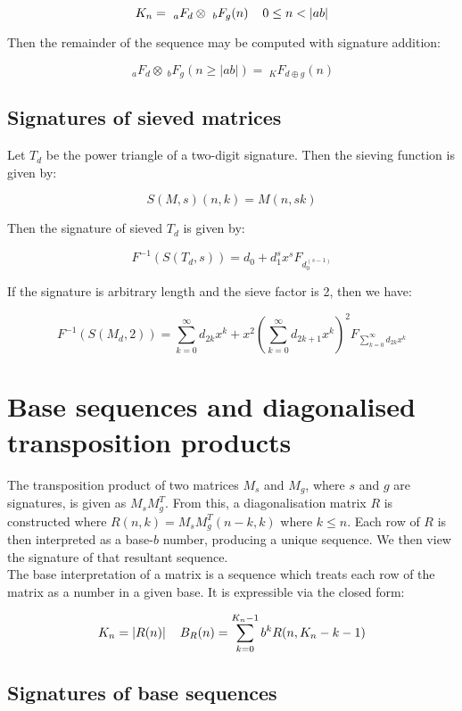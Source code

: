 \documentclass{article}
\begin{document}
$$K_n = ~_a F_d \otimes ~_b F_g (n) \hspace{4mm} 0 \leq n < |ab|$$

\noindent Then the remainder of the sequence may be computed with signature addition:

$$~_a F_d \otimes ~_b F_g (n \geq |ab|) = ~_K F_{d \oplus g}(n)$$

\subsection{Signatures of sieved matrices}

Let $T_d$ be the power triangle of a two-digit signature. Then the sieving function is given by:

$$S(M, s)(n, k) = M(n, sk)$$

\noindent Then the signature of sieved $T_d$ is given by:

$$F^{-1}(S(T_d, s)) = d_0 + d_1^s x^s F_{d_0^{(s-1)}}$$

\noindent If the signature is arbitrary length and the sieve factor is 2, then we have:

$$F^{-1}(S(M_d, 2)) = \sum_{k=0}^{\infty} d_{2k} x^k + x^2 \left( \sum_{k=0}^{\infty} d_{2k+1} x^k \right)^2 F_{\displaystyle \sum_{k=0}^{\infty} d_{2k} x^k}$$

\section{Base sequences and diagonalised transposition products}

The transposition product of two matrices $M_s$ and $M_g$, where $s$ and $g$ are signatures, is given as $M_s M_g^T$. From this, a diagonalisation matrix $R$ is constructed where $R(n,k) = M_s M_g^T (n-k, k)$ where $k \leq n$. Each row of $R$ is then interpreted as a base-$b$ number, producing a unique sequence. We then view the signature of that resultant sequence.\\

\noindent The base interpretation of a matrix is a sequence which treats each row of the matrix as a number in a given base. It is expressible via the closed form:

$$K_n = |R(n)| \hspace{4mm} B_{R}(n) = \sum_{k=0}^{K_n-1} b^k R (n, K_n - k - 1)$$

\subsection{Signatures of base sequences}
\end{document}
